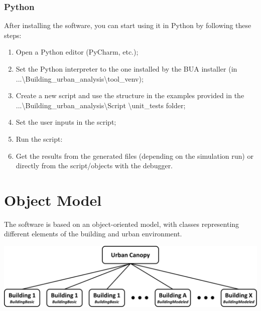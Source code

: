 \documentclass[a4paper,12pt]{article} %
\begin{document}
    \subsubsection{Python}
    After installing the software, you can start using it in Python by following these steps:
    \begin{enumerate}
        \item Open a Python editor (PyCharm, etc.);
        \item Set the Python interpreter to the one installed by the BUA installer (in ...\textbackslash Building\_urban\_analysis\textbackslash tool\_venv);
        \item Create a new script and use the structure in the examples provided in the ...\textbackslash Building\_urban\_analysis\textbackslash Script \textbackslash unit\_tests folder;
        \item Set the user inputs in the script;
        \item Run the script:
        \item Get the results from the generated files (depending on the simulation run) or directly from the script/objects with the debugger.
    \end{enumerate}


    \section{Object Model}
    The software is based on an object-oriented model, with classes representing different elements of the building and urban environment.

    \begin{center}
        \captionsetup{justification=centering} %
        \includegraphics[width=15cm]{Figures/Objects.png}%
        \label{fig SimulationObj}
    \end{center}
\end{document}
